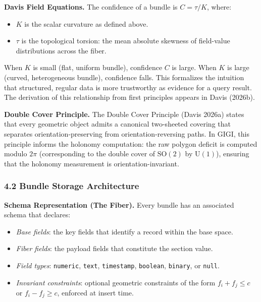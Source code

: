 \documentclass[11pt,letterpaper]{article}
\begin{document}
\textbf{Davis Field Equations.} The confidence of a bundle is $C = \tau / K$, where:
\begin{itemize}[nosep]
  \item $K$ is the scalar curvature as defined above.
  \item $\tau$ is the topological torsion: the mean absolute skewness of field-value distributions across the fiber.
\end{itemize}
When $K$ is small (flat, uniform bundle), confidence $C$ is large. When $K$ is large (curved, heterogeneous bundle), confidence falls. This formalizes the intuition that structured, regular data is more trustworthy as evidence for a query result. The derivation of this relationship from first principles appears in Davis (2026b).

\textbf{Double Cover Principle.} The Double Cover Principle (Davis 2026a) states that every geometric object admits a canonical two-sheeted covering that separates orientation-preserving from orientation-reversing paths. In GIGI, this principle informs the holonomy computation: the raw polygon deficit is computed modulo $2\pi$ (corresponding to the double cover of $\mathrm{SO}(2)$ by $\mathrm{U}(1)$), ensuring that the holonomy measurement is orientation-invariant.


\subsubsection*{4.2 Bundle Storage Architecture}

\textbf{Schema Representation (The Fiber).} Every bundle has an associated schema that declares:
\begin{itemize}[nosep]
  \item \emph{Base fields}: the key fields that identify a record within the base space.
  \item \emph{Fiber fields}: the payload fields that constitute the section value.
  \item \emph{Field types}: \texttt{numeric}, \texttt{text}, \texttt{timestamp}, \texttt{boolean}, \texttt{binary}, or \texttt{null}.
  \item \emph{Invariant constraints}: optional geometric constraints of the form $f_i + f_j \leq c$ or $f_i - f_j \geq c$, enforced at insert time.
\end{itemize}
\end{document}

